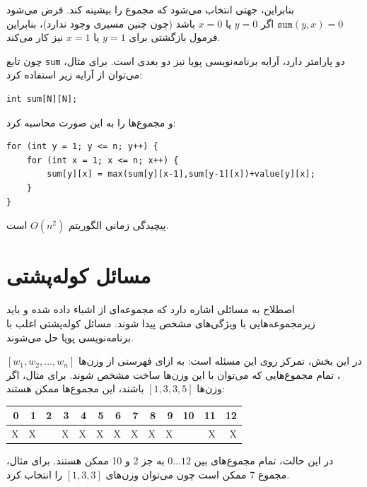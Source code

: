 بنابراین، جهتی انتخاب می‌شود که مجموع را بیشینه کند.
فرض می‌شود $\texttt{sum}(y,x)=0$
اگر $y=0$ یا $x=0$ باشد (چون چنین مسیری وجود ندارد)،
بنابراین فرمول بازگشتی برای $y=1$ یا $x=1$ نیز کار می‌کند.

چون تابع \texttt{sum} دو پارامتر دارد،
آرایه برنامه‌نویسی پویا نیز دو بعدی است.
برای مثال، می‌توان از آرایه زیر استفاده کرد:
\begin{lstlisting}
int sum[N][N];
\end{lstlisting}
و مجموع‌ها را به این صورت محاسبه کرد:
\begin{lstlisting}
for (int y = 1; y <= n; y++) {
    for (int x = 1; x <= n; x++) {
        sum[y][x] = max(sum[y][x-1],sum[y-1][x])+value[y][x];
    }
}
\end{lstlisting}
پیچیدگی زمانی الگوریتم $O(n^2)$ است.

\section{مسائل کوله‌پشتی}


اصطلاح  به مسائلی اشاره دارد که
مجموعه‌ای از اشیاء داده شده و
باید زیرمجموعه‌هایی با ویژگی‌های مشخص پیدا شوند.
مسائل کوله‌پشتی اغلب با برنامه‌نویسی پویا حل می‌شوند.

در این بخش، تمرکز روی این مسئله است:
به ازای فهرستی از وزن‌ها
$[w_1,w_2,\ldots,w_n]$،
تمام مجموع‌هایی که می‌توان با این وزن‌ها ساخت مشخص شوند.
برای مثال، اگر وزن‌ها
$[1,3,3,5]$ باشند، این مجموع‌ها ممکن هستند:

\begin{center}
\begin{tabular}{rrrrrrrrrrrrr}
 0 & 1 & 2 & 3 & 4 & 5 & 6 & 7 & 8 & 9 & 10 & 11 & 12 \\
\hline
 X & X & & X & X & X & X & X & X & X & & X & X \\
\end{tabular}
\end{center}

در این حالت، تمام مجموع‌های بین $0 \ldots 12$
به جز 2 و 10 ممکن هستند.
برای مثال، مجموع 7 ممکن است چون می‌توان
وزن‌های $[1,3,3]$ را انتخاب کرد.

